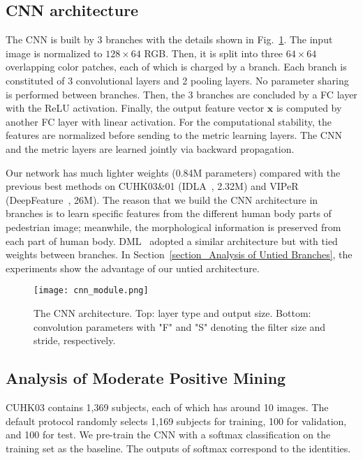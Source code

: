 \documentclass[runningheads]{llncs}
\begin{document}
\subsection{CNN architecture}
\label{section_CNN architecture}

The CNN is built by 3 branches with the details shown in Fig.~\ref{fig_CNN}.
The input image is normalized to $128\times64$ RGB. Then, it is split into three $64\times64$ overlapping color patches, each of which is charged by a branch. Each branch is constituted of 3 convolutional layers and 2 pooling layers. No parameter sharing is performed between branches. Then, the 3 branches are concluded by a FC layer with the ReLU activation. Finally, the output feature vector $\mathbf{x}$ is computed by another FC layer with linear activation.
For the computational stability, the features are normalized before sending to the metric learning layers.
The CNN and the metric layers are learned jointly via backward propagation.

Our network has much lighter weights (0.84M parameters) compared with the previous best methods on CUHK03\&01 (IDLA~\cite{ahmed2015improved}, 2.32M) and VIPeR (DeepFeature~\cite{ding2015deep}, 26M).
The reason that we build the CNN architecture in branches is to learn specific features from the different human body parts of pedestrian image; meanwhile, the morphological information is preserved from each part of human body.
DML~\cite{yi2014deep} adopted a similar architecture but with tied weights between branches.
In Section~\ref{section_Analysis of Untied Branches}, the experiments show the advantage of our untied architecture.



\begin{figure}[!htb]
  \centering
  \texttt{[image: cnn\_module.png]}
  \caption{The CNN architecture. Top: layer type and output size. Bottom: convolution parameters with "F" and "S" denoting the filter size and stride, respectively.}
  \label{fig_CNN}
\end{figure}



\subsection{Analysis of Moderate Positive Mining}
\label{section_Analysis of Moderate Positive Mining}

CUHK03 contains 1,369 subjects, each of which has around 10 images.
The default protocol randomly selects 1,169 subjects for training, 100 for validation, and 100 for test.
We pre-train the CNN with a softmax classification on the training set as the baseline.
The outputs of softmax correspond to the identities.
\end{document}
